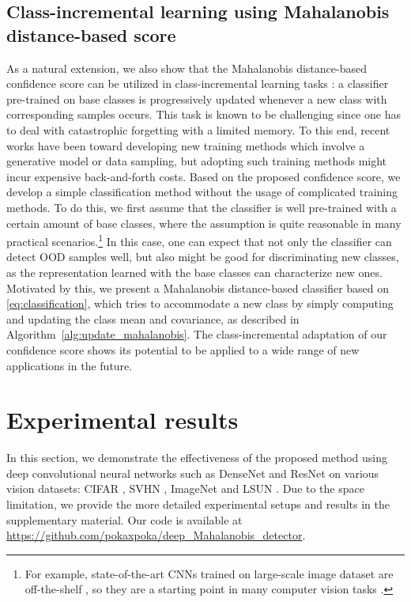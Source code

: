 \documentclass{article}
\begin{document}
\subsection{Class-incremental learning using Mahalanobis distance-based score}\label{sec:incrementalsetup}

{
As a natural extension, we also show that the Mahalanobis distance-based confidence score can be utilized in class-incremental learning tasks \citep{rebuffi2017icarl}:
a classifier pre-trained on base classes is progressively updated whenever a new class with corresponding samples occurs.
This task is known to be challenging since one has to deal with catastrophic forgetting \citep{mccloskey1989catastrophic} with a limited memory.
To this end, recent works have been toward developing new training methods which involve a generative model or data sampling, but adopting such training
methods might incur expensive back-and-forth costs.
Based on the proposed confidence score, we develop a simple classification method without the usage of complicated training methods.
To do this, we first assume that the classifier is well pre-trained with a certain amount of base classes, where
the assumption is quite reasonable in many practical scenarios.\footnote{For example, state-of-the-art CNNs trained on large-scale image dataset are off-the-shelf \citep{he2016deep, huang2017densely}, so they are a starting point in many computer vision tasks \citep{girshick2015fast, lee2018hierarchical, mensink2013distance}.}
In this case, one can expect that not only the classifier can detect OOD samples well, but also might be good for discriminating new classes, as the representation learned with the base classes can characterize new ones.
Motivated by this, 
we present a Mahalanobis distance-based classifier based on \eqref{eq:classification},
which tries to accommodate a new class by simply computing and updating the class mean and covariance, as described in Algorithm~\ref{alg:update_mahalanobis}.}
The class-incremental adaptation of our confidence score shows its potential to be applied to a wide range of new applications in the future.






\section{Experimental results} \label{sec:exp}


In this section, we demonstrate the effectiveness of the proposed method using deep convolutional neural networks such as DenseNet \citep{huang2017densely} and ResNet \citep{he2016deep} on various vision datasets: CIFAR \citep{krizhevsky2009learning}, SVHN \citep{netzer2011reading}, ImageNet \citep{deng2009imagenet} and LSUN \citep{yu2015lsun}.
Due to the space limitation, we provide the more detailed experimental setups and results in the supplementary material. Our code is available at \url{https://github.com/pokaxpoka/deep_Mahalanobis_detector}.
\end{document}
